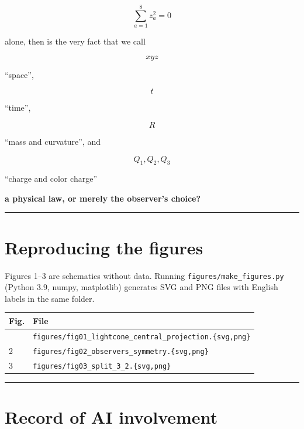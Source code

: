 \documentclass[
  a4paper,
]{article}
\newcounter{none} %
\begin{document}
\[
\boxed{
\sum_{a=1}^{8} z_a^2=0
}
\]

alone, then is the very fact that we call

\[
xyz
\]

``space'',

\[
t
\]

``time'',

\[
R
\]

``mass and curvature'', and

\[
Q_1,Q_2,Q_3
\]

``charge and color charge''

\textbf{a physical law, or merely the observer's choice?}

\begin{center}\rule{0.5\linewidth}{0.5pt}\end{center}

\section{Reproducing the figures}\label{reproducing-the-figures}

Figures 1--3 are schematics without data. Running
\texttt{figures/make\_figures.py} (Python 3.9, numpy, matplotlib)
generates SVG and PNG files with English labels in the same folder.

{\def\LTcaptype{none} %
\begin{longtable}[]{@{}ll@{}}
\toprule\noalign{}
Fig. & File \\
\midrule\noalign{}
\endhead
\bottomrule\noalign{}
\endlastfoot
1 &
\texttt{figures/fig01\_lightcone\_central\_projection.\{svg,png\}} \\
2 & \texttt{figures/fig02\_observers\_symmetry.\{svg,png\}} \\
3 & \texttt{figures/fig03\_split\_3\_2.\{svg,png\}} \\
\end{longtable}
}

\begin{center}\rule{0.5\linewidth}{0.5pt}\end{center}

\section{Record of AI involvement}\label{record-of-ai-involvement}
\end{document}

